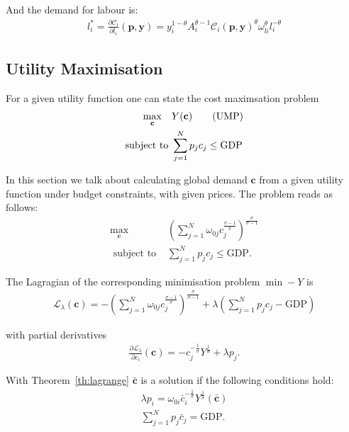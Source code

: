 \documentclass{article}
\newcommand{\costf}[1]{\mathscr{C}_#1}
\begin{document}
And the demand for labour is:
\begin{align}
  l_i^* = \frac{\partial \costf{i}}{\partial l_i}(\mathbf p,\mathbf y)= y_i^{1 - \theta} A_i^{\theta - 1} \costf{i}(\mathbf p,\mathbf y)^\theta \omega_{li}^\theta l_i^{-\theta}
\end{align}


\subsection{Utility Maximisation}
For a given utility function one can state the cost maximsation problem 
\begin{align}
  \label{eq:utilitymax}
  \max_{\mathbf c}  \quad & Y(\mathbf c) \tag{UMP} \\
  \text{subject to } & \sum_{j=1}^N p_j c_j \leq \text{GDP} \notag
\end{align}

In this section we talk about calculating global demand $\mathbf{c}$ from a given utility function under budget constraints, with given prices.
The problem reads as follows:
\begin{align*}
  \max_{\mathbf c} & \left(\sum_{j=1}^N \omega_{0j}  c_j^{\frac{\sigma - 1}{\sigma}} \right)^{\frac{\sigma}{\sigma - 1}} \\
  \text{ subject to } &\sum_{j=1}^N p_j c_j \leq \text{GDP}.
\end{align*}

The Lagragian of the corresponding minimisation problem $\min - Y$ is 
\begin{align}
  \mathcal L_\lambda(\mathbf c) = - \left(\sum_{j=1}^N \omega_{0j}  c_j^{\frac{\sigma - 1}{\sigma}} \right)^{\frac{\sigma}{\sigma - 1}}  + \lambda \left(\sum_{j=1}^N p_j c_j - \text{GDP} \right)
\end{align}

with partial derivatives
\begin{align*}
  \frac{\partial \mathcal L_\lambda}{\partial c_i}(\mathbf c) = - c_j^{- \frac{1}{\sigma}} Y^{\frac{1}{\sigma}} + \lambda p_j.
\end{align*}

With Theorem~\ref{th:lagrange} $\mathbf{ \bar c}$ is a solution if the following conditions hold:
\begin{align*}
  \lambda p_i =  \omega_{0i} \bar c_i^{- \frac{1}{\sigma}} Y^{\frac{1}{\sigma}}(\mathbf{\bar c}) \\
  \sum_{j=1}^N p_j \bar c_j = \text{GDP}.
\end{align*}
\end{document}
